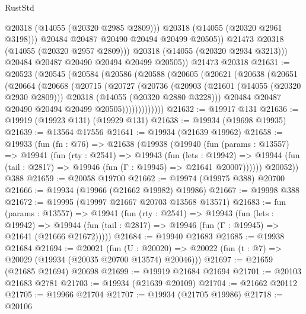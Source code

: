 \begin{lexlean}{RustStd}
\begin{coremodule}
                    @20318
                    (@14055 (@20320 @2985 @2809)))
                  @20318
                  (@14055 (@20320 @2961 @3198)))
                @20484
                @20487
                @20490
                @20494
                @20499
                @20505))
            @21473
            @20318
            (@14055 (@20320 @2957 @2809)))
          @20318
          (@14055 (@20320 @2934 @3213)))
        @20484
        @20487
        @20490
        @20494
        @20499
        @20505))
    @21473
    @20318
@21631 := @20523
    (@20545
      (@20584
        (@20586
          (@20588
            (@20605
              (@20621
                (@20638
                  (@20651
                    (@20664
                      (@20668
                        (@20715
                          (@20727
                            (@20736
                              (@20903
                                (@21601 (@14055 (@20320 @2930 @2809)))
                                @20318
                                (@14055 (@20320 @2880 @3228)))
                              @20484
                              @20487
                              @20490
                              @20494
                              @20499
                              @20505)))))))))))))
@21632 := @19917 @131
@21636 := @19919 (@19923 @131) (@19929 @131)
@21638 := @19934 (@19698 @19935)
@21639 := @13564 @17556
@21641 := @19934 (@21639 @19962)
@21658 := @19933
    (fun (fn : @76) =>
    @21638
      (@19938
        (@19940
          (fun (params : @13557) =>
          @19941
            (fun (rty : @2541) =>
            @19943
              (fun (lets : @19942) =>
              @19944 (fun (tail : @2817) => @19946 (fun (Γ : @19945) => @21641 @20007))))))
        @20052))
    @388
@21659 := @20058 @19700
@21662 := @19974 (@19975 @388) @20700
@21666 := @19934 (@19966 (@21662 @19982) @19986)
@21667 := @19998 @388
@21672 := @19995 (@19997 @21667 @20703 @13568 @13571)
@21683 := fun (params : @13557) =>
  @19941
    (fun (rty : @2541) =>
    @19943
      (fun (lets : @19942) =>
      @19944 (fun (tail : @2817) => @19946 (fun (Γ : @19945) => @21641 (@21666 @21672)))))
@21684 := @19940 @21683
@21685 := @19938 @21684
@21694 := @20021
    (fun (U : @20020) => @20022 (fun (t : @7) => @20029 (@19934 (@20035 @20700 @13574) @20046)))
@21697 := @21659 (@21685 @21694) @20698
@21699 := @19919 @21684 @21694
@21701 := @20103 @21683 @2781
@21703 := @19934 (@21639 @20109)
@21704 := @21662 @20112
@21705 := @19966 @21704
@21707 := @19934 (@21705 @19986)
@21718 := @20106

\end{coremodule}
\end{lexlean}
